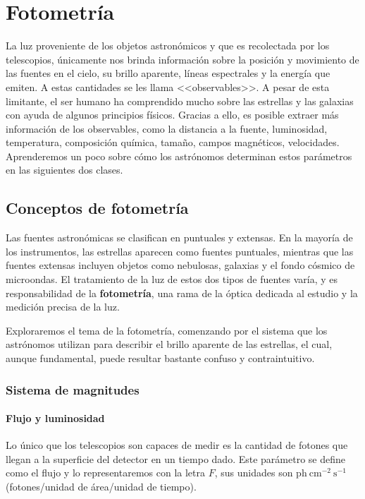 \chapter{Fotometría}
La luz proveniente de los objetos astronómicos y que es recolectada por los telescopios, únicamente nos brinda información sobre la posición y movimiento de las fuentes en el cielo, su brillo aparente, líneas espectrales y la energía que emiten. A estas cantidades se les llama <<observables>>. A pesar de esta limitante, el ser humano ha comprendido mucho sobre las estrellas y las galaxias con ayuda de algunos principios físicos. Gracias a ello, es posible extraer más información de los observables, como la distancia a la fuente, luminosidad, temperatura, composición química, tamaño, campos magnéticos, velocidades. Aprenderemos un poco sobre cómo los astrónomos determinan estos parámetros en las siguientes dos clases.

\section{Conceptos de fotometría}
Las fuentes astronómicas se clasifican en puntuales y extensas. En la mayoría de los instrumentos, las estrellas aparecen como fuentes puntuales, mientras que las fuentes extensas incluyen objetos como nebulosas, galaxias y el fondo cósmico de microondas. El tratamiento de la luz de estos dos tipos de fuentes varía, y es responsabilidad de la \textbf{fotometría}, una rama de la óptica dedicada al estudio y la medición precisa de la luz.

Exploraremos el tema de la fotometría, comenzando por el sistema que los astrónomos utilizan para describir el brillo aparente de las estrellas, el cual, aunque fundamental, puede resultar bastante confuso y contraintuitivo.

\subsection{Sistema de magnitudes}
\subsubsection{Flujo y luminosidad}
Lo único que los telescopios son capaces de medir es la cantidad de fotones que llegan a la superficie del detector en un tiempo dado. Este parámetro se define como el flujo y lo representaremos con la letra $ F $, sus unidades son  $ \mathrm{ph~ cm^{-2} ~ s^{-1} }$ (fotones/unidad de área/unidad de tiempo). 

